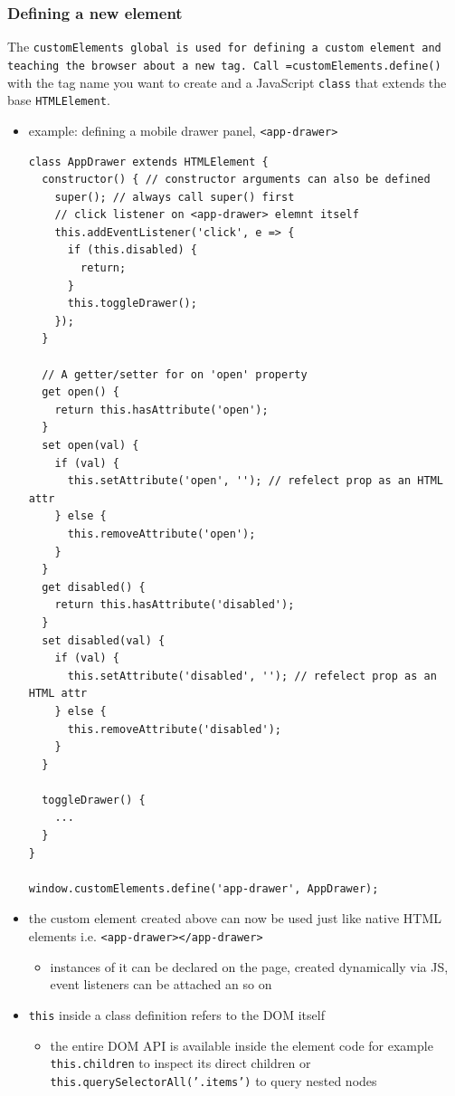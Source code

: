 \documentclass[11pt]{article}
\begin{document}
\subsubsection{Defining a new element}
\label{sec:orgacd5103}
The \texttt{customElements global is used for defining a custom element and teaching the browser about a new tag. Call =customElements.define()} with the tag name you want to create and a JavaScript \texttt{class} that extends the base \texttt{HTMLElement}.
\begin{itemize}
\item example: defining a mobile drawer panel, \texttt{<app-drawer>}
\lstset{breaklines=true,language=js,label= ,caption= ,captionpos=b,numbers=none}
\begin{lstlisting}
class AppDrawer extends HTMLElement {
  constructor() { // constructor arguments can also be defined
    super(); // always call super() first
    // click listener on <app-drawer> elemnt itself
    this.addEventListener('click', e => {
      if (this.disabled) {
        return;
      }
      this.toggleDrawer();
    });
  }

  // A getter/setter for on 'open' property
  get open() {
    return this.hasAttribute('open');
  }
  set open(val) {
    if (val) {
      this.setAttribute('open', ''); // refelect prop as an HTML attr
    } else {
      this.removeAttribute('open');
    }
  }
  get disabled() {
    return this.hasAttribute('disabled');
  }
  set disabled(val) {
    if (val) {
      this.setAttribute('disabled', ''); // refelect prop as an HTML attr
    } else {
      this.removeAttribute('disabled');
    }
  }

  toggleDrawer() {
    ... 
  }
}

window.customElements.define('app-drawer', AppDrawer);
\end{lstlisting}
\item the custom element created above can now be used just like native HTML elements i.e. \texttt{<app-drawer></app-drawer>}
\begin{itemize}
\item instances of it can be declared on the page, created dynamically via JS, event listeners can be attached an so on
\end{itemize}
\item \texttt{this} inside a class definition refers to the DOM itself
\begin{itemize}
\item the entire DOM API is available inside the element code for example \texttt{this.children} to inspect its direct children or \texttt{this.querySelectorAll('.items')} to query nested nodes
\end{itemize}
\end{itemize}
\end{document}
